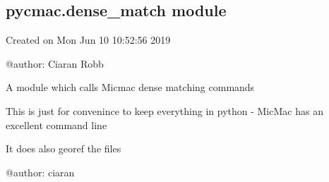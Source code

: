 \documentclass[letterpaper,10pt,english]{sphinxmanual}
\begin{document}
\subsection{pycmac.dense\_match module}
\label{\detokenize{pycmac:module-dense_match}}\label{\detokenize{pycmac:pycmac-dense-match-module}}
Created on Mon Jun 10 10:52:56 2019

@author: Ciaran Robb

A module which calls Micmac dense matching commands

This is just for convenince  to keep everything in python - MicMac has an
excellent command line

It does also georef the files


@author: ciaran
\end{document}
